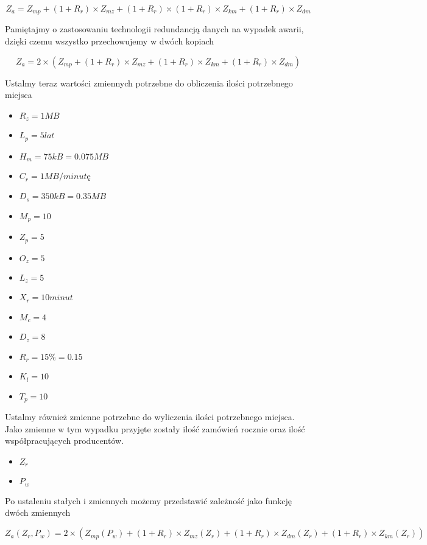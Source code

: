 						\[ Z_a = Z_{mp} + (1 + R_r) \times Z_{mz} + (1 + R_r) \times (1 + R_r) \times Z_{km} + (1 + R_r) \times Z_{dm} \]
			
						Pamiętajmy o zastosowaniu technologii redundancją danych na wypadek awarii, dzięki czemu wszystko przechowujemy w dwóch kopiach 
						
						\[ Z_a = 2 \times ( Z_{mp} + (1 + R_r) \times Z_{mz} + (1 + R_r) \times Z_{km} + (1 + R_r) \times Z_{dm} ) \]
						
						Ustalmy teraz wartości zmiennych potrzebne do obliczenia ilości potrzebnego miejsca
		
						\begin{itemize}
							\item \( R_z = 1MB \)
							\item \( L_p = 5 lat \) 
							\item \( H_m = 75kB = 0.075MB \)
							\item \( C_r = 1MB/minutę \)
							\item \( D_s = 350kB = 0.35MB \)
							\item \( M_p = 10 \)
							\item \( Z_p = 5 \)
							\item \( O_z = 5 \) 
							\item \( L_z = 5 \) 
							\item \( X_r = 10 minut \)
							\item \( M_c = 4 \) 
							\item \( D_z = 8 \)
							\item \( R_r = 15\% = 0.15 \)
							\item \( K_l = 10 \)
							\item \( T_p = 10 \) 
						\end{itemize}
		
					Ustalmy również zmienne potrzebne do wyliczenia ilości potrzebnego miejsca. Jako zmienne w tym wypadku przyjęte zostały ilość zamówień rocznie oraz ilość współpracujących producentów. 
					
					\begin{itemize}
						\item \( Z_r \)
						\item \( P_w \)
					\end{itemize}
				
					Po ustaleniu stałych i zmiennych możemy przedstawić zależność jako funkcję dwóch zmiennych
				
					\[ Z_a(Z_r,P_w) = 2 \times ( Z_{mp}(P_w) + (1 + R_r) \times Z_{mz}(Z_r) + (1 + R_r) \times Z_{dm}(Z_r) + (1 + R_r) \times Z_{km}(Z_r) ) \]
				
